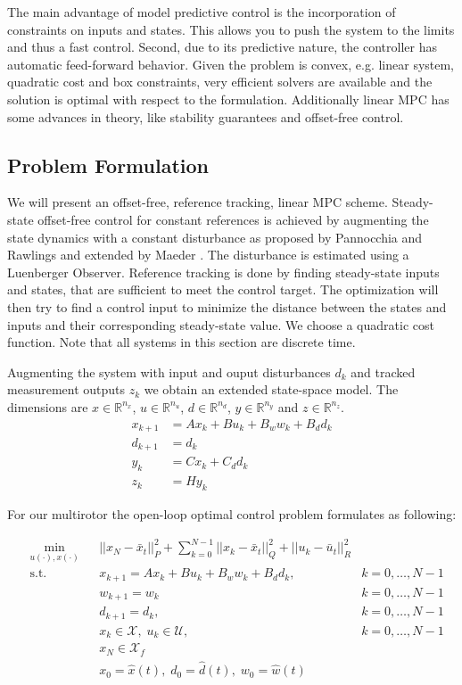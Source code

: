 The main advantage of model predictive control is the incorporation of constraints on inputs and states. This allows you to push the system to the limits and thus a fast control. Second, due to its predictive nature, the controller has automatic feed-forward behavior. Given the problem is convex, e.g. linear system, quadratic cost and box constraints, very efficient solvers are available and the solution is optimal with respect to the formulation. Additionally linear MPC has some advances in theory, like stability guarantees and offset-free control.

\subsection{Problem Formulation}
We will present an offset-free, reference tracking, linear MPC scheme. Steady-state offset-free control for constant references is achieved by augmenting the state dynamics with a constant disturbance as proposed by Pannocchia and Rawlings and extended by Maeder \cite{Pannocchia2003a,Maeder2009}. The disturbance is estimated using a Luenberger Observer. Reference tracking is done by finding steady-state inputs and states, that are sufficient to meet the control target. The optimization will then try to find a control input to minimize the distance between the states and inputs and their corresponding steady-state value. We choose a quadratic cost function. Note that all systems in this section are discrete time. 

Augmenting the system with input and ouput disturbances $d_k$ and tracked measurement outputs $z_k$ we obtain an extended state-space model. The dimensions are $x\in\mathbb{R}^{n_x}$, $u\in\mathbb{R}^{n_u}$, $d\in\mathbb{R}^{n_d}$, $y\in\mathbb{R}^{n_y}$ and $z\in\mathbb{R}^{n_z}$.
\begin{align}
x_{k+1} &= A x_k + B u_k + B_w w_k + B_d d_k \label{eq:MPC_dt}\\
d_{k+1} &= d_k \nonumber \\ 
y_{k} &= C x_k + C_d d_k \nonumber \\
z_k &= H y_k 
\end{align}

For our multirotor the open-loop optimal control problem formulates as following:

\begin{align}
&\min_{u(\cdot),x(\cdot)}
& & ||x_N-\bar{x}_t||_P^2 + \sum_{k=0}^{N-1} ||x_k - \bar{x}_t||_Q^2 + ||u_k - \bar{u}_t||_R^2  \nonumber\\
& \text{s.t.} 
& & x_{k+1} = A x_k + B u_k + B_w w_k + B_d d_k, & k = 0, \ldots, N-1 \nonumber\\
& & & w_{k+1} = w_k  & k = 0, \ldots, N-1 \nonumber\\
& & & d_{k+1} = d_k, & k = 0, \ldots, N-1 \nonumber\\
& & & x_k \in \mathcal{X}, \; u_k \in \mathcal{U}, & k = 0, \ldots, N-1 \nonumber\\
& & & x_N \in \mathcal{X}_f \nonumber\\
& & & x_0 = \hat x (t), \; d_0 = \hat d(t), \; w_0 = \hat w(t) \label{eq:mpc_opti}
\end{align}

